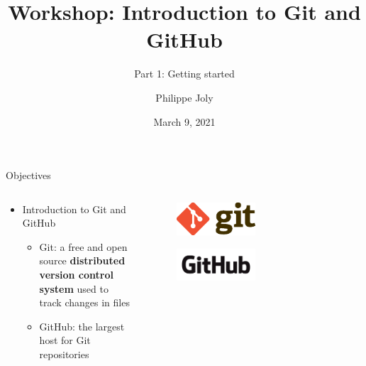 \documentclass[handout]{beamer}
\title{Workshop: Introduction to Git and GitHub}
\subtitle{Part 1: Getting started}
\author[P. Joly]{Philippe Joly}
\institute[FU-Berlin]{Freie Universität Berlin}
\date{March 9, 2021}
\begin{document}
\begin{frame}
\titlepage
\end{frame}


%
%


\begin{frame}{Objectives}
  \begin{columns}
  
    \begin{column}{0.5\textwidth}
    	\begin{itemize}
			  \item Introduction to Git and GitHub
			  \begin{itemize}
				  \item Git: a free and open source \textbf{distributed version control system} used to track changes in files
				  \item GitHub: the largest host for Git repositories
			  \end{itemize}
		  \end{itemize}
		\end{column}
		
    \begin{column}{0.5\textwidth}
      \begin{figure}
	      \includegraphics[width=0.5\textwidth]{figures/git_logo.eps}
	      \caption{}
      \end{figure}
      \begin{figure}
	      \includegraphics[width=0.5\textwidth]{figures/github_logo.png}
	      \caption{}
      \end{figure}
    \end{column}
  \end{columns}
\end{frame}
\end{document}
